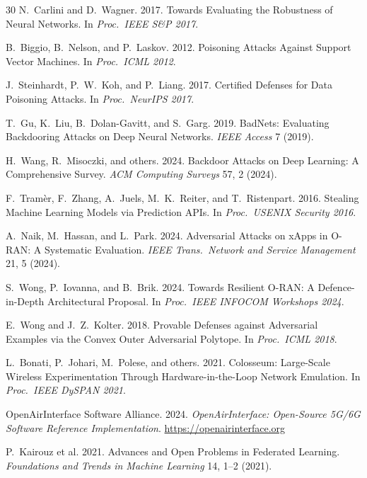 \documentclass[sigconf,nonacm]{acmart}
\begin{document}
\begin{thebibliography}{30}
N.~Carlini and D.~Wagner. 2017. Towards Evaluating the Robustness
of Neural Networks. In \textit{Proc.\ IEEE S\&P 2017}.

B.~Biggio, B.~Nelson, and P.~Laskov. 2012. Poisoning Attacks
Against Support Vector Machines. In \textit{Proc.\ ICML 2012}.

J.~Steinhardt, P.~W.~Koh, and P.~Liang. 2017. Certified Defenses
for Data Poisoning Attacks. In \textit{Proc.\ NeurIPS 2017}.

T.~Gu, K.~Liu, B.~Dolan-Gavitt, and S.~Garg. 2019. BadNets:
Evaluating Backdooring Attacks on Deep Neural Networks.
\textit{IEEE Access} 7 (2019).

H.~Wang, R.~Misoczki, and others. 2024. Backdoor Attacks on Deep
Learning: A Comprehensive Survey. \textit{ACM Computing Surveys}
57, 2 (2024).

F.~Tram\`er, F.~Zhang, A.~Juels, M.~K.~Reiter, and T.~Ristenpart.
2016. Stealing Machine Learning Models via Prediction APIs.
In \textit{Proc.\ USENIX Security 2016}.

A.~Naik, M.~Hassan, and L.~Park. 2024. Adversarial Attacks on
xApps in O-RAN: A Systematic Evaluation.
\textit{IEEE Trans.\ Network and Service Management} 21, 5 (2024).

S.~Wong, P.~Iovanna, and B.~Brik. 2024. Towards Resilient
O-RAN: A Defence-in-Depth Architectural Proposal.
In \textit{Proc.\ IEEE INFOCOM Workshops 2024}.

E.~Wong and J.~Z.~Kolter. 2018. Provable Defenses against
Adversarial Examples via the Convex Outer Adversarial Polytope.
In \textit{Proc.\ ICML 2018}.

L.~Bonati, P.~Johari, M.~Polese, and others. 2021. Colosseum:
Large-Scale Wireless Experimentation Through Hardware-in-the-Loop
Network Emulation. In \textit{Proc.\ IEEE DySPAN 2021}.

OpenAirInterface Software Alliance. 2024. \textit{OpenAirInterface:
Open-Source 5G/6G Software Reference Implementation}.
\url{https://openairinterface.org}

P.~Kairouz et al. 2021. Advances and Open Problems in Federated
Learning. \textit{Foundations and Trends in Machine Learning} 14,
1--2 (2021).


\end{thebibliography}
\end{document}
